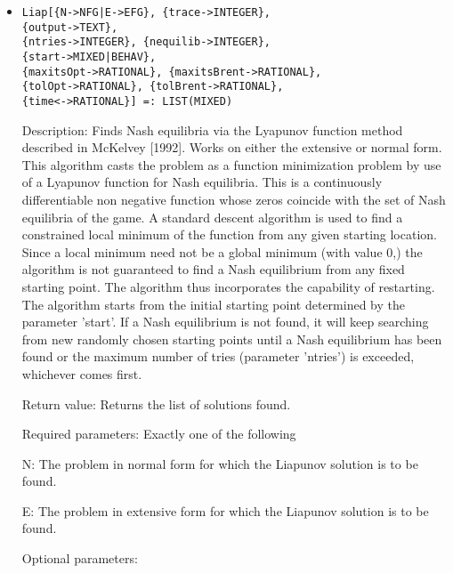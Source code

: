\begin{itemize}
\item
\protect \large \begin{verbatim}
Liap[{N->NFG|E->EFG}, {trace->INTEGER},
{output->TEXT},
{ntries->INTEGER}, {nequilib->INTEGER},
{start->MIXED|BEHAV},
{maxitsOpt->RATIONAL}, {maxitsBrent->RATIONAL}, 
{tolOpt->RATIONAL}, {tolBrent->RATIONAL},
{time<->RATIONAL}] =: LIST(MIXED)
\end{verbatim}\normalsize

\bd
\item
[Description:] Finds Nash equilibria via the Lyapunov function method
described in McKelvey [1992].  Works on either the extensive or normal
form.  This algorithm casts the problem as a function minimization
problem by use of a Lyapunov function for Nash equilibria.  This is a
continuously differentiable non negative function whose zeros coincide
with the set of Nash equilibria of the game.  A standard descent
algorithm is used to find a constrained local minimum of the function
from any given starting location.  Since a local minimum need not be a
global minimum (with value 0,) the algorithm is not guaranteed to find
a Nash equilibrium from any fixed starting point.  The algorithm thus
incorporates the capability of restarting.  The algorithm starts from
the initial starting point determined by the parameter 'start'.  If a
Nash equilibrium is not found, it will keep searching from new
randomly chosen starting points until a Nash equilibrium has been
found or the maximum number of tries (parameter 'ntries') is exceeded,
whichever comes first.
\item
[Return value:] Returns the list of solutions found.
\item
[Required parameters:] Exactly one of the following \hfil\null

\bd
\item
[N:] The problem in normal form for which the Liapunov solution is to
be found.
\item
[E:] The problem in extensive form for which the Liapunov solution is
to be found.
\ed

\item
[Optional parameters:]\hfil\null


\end{itemize}
